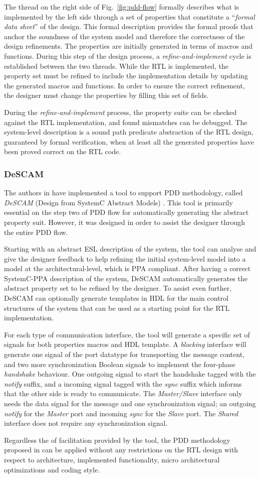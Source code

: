 The thread on the right side of Fig.~\ref{fig:pdd-flow} formally describes what is implemented by the left side through a set of properties that constitute a “\textit{formal data sheet}” of the design. This formal description provides the formal proofs that anchor the soundness of the system model and therefore the correctness of the design refinements. The properties are initially generated in terms of macros and functions. During this step of the design process, a \textit{refine-and-implement} cycle is established between the two threads. While the RTL is implemented, the property set must be refined to include the implementation details by updating the generated macros and functions. In order to ensure the correct refinement, the designer must change the properties by filling this set of fields.

During the \textit{refine-and-implement} process, the property suite can be checked against the RTL implementation, and found mismatches can be debugged. The system-level description is a sound path predicate abstraction of the RTL design, guaranteed by formal verification, when at least all the generated properties have been proved correct on the RTL code.

\subsubsection*{DeSCAM}

The authors in \cite{paper-pdd} have implemented a tool to support PDD methodology, called \textit{DeSCAM} (Design from SystemC Abstract Models) \cite{descam}. This tool is primarily essential on the step two of PDD flow for automatically generating the abstract property suit. However, it was designed in order to assist the designer through the entire PDD flow.

Starting with an abstract ESL description of the system, the tool can analyse and give the designer feedback to help refining the initial system-level model into a model at the architectural-level, which is PPA compliant. After having a correct SystemC-PPA description of the system, DeSCAM automatically generates the abstract property set to be refined by the designer. To assist even further, DeSCAM can optionally generate templates in HDL for the main control structures of the system that can be used as a starting point for the RTL implementation.

For each type of communication interface, the tool will generate a specific set of signals for both properties macros and HDL template. A \textit{blocking} interface will generate one signal of the port datatype for transporting the message content, and two more synchronization Boolean signals to implement the four-phase \textit{handshake} behaviour. One outgoing signal to start the handshake tagged with the \textit{notify} suffix, and a incoming signal tagged with the \textit{sync} suffix which informs that the other side is ready to communicate. The \textit{Master/Slave} interface only needs the data signal for the message and one synchronization signal; an outgoing \textit{notify} for the \textit{Master} port and incoming \textit{sync} for the \textit{Slave} port. The \textit{Shared} interface does not require any synchronization signal.

Regardless the of facilitation provided by the tool, the PDD methodology proposed in \cite{paper-pdd} can be applied without any restrictions on the RTL design with respect to architecture, implemented functionality, micro architectural optimizations and coding style. 
